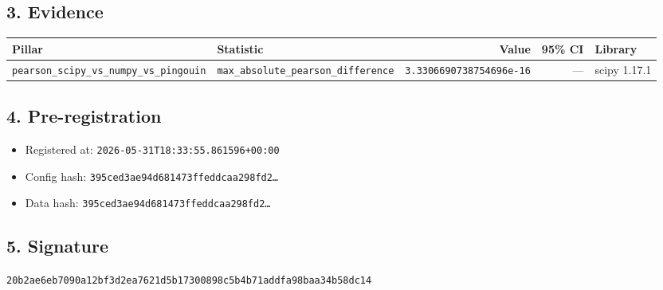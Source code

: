\documentclass{article}
\begin{document}
\subsection*{3. Evidence}
\begin{tabular}{llrrl}\toprule
\textbf{Pillar} & \textbf{Statistic} & \textbf{Value} & \textbf{95\% CI} & \textbf{Library} \\\midrule
\texttt{pearson\_scipy\_vs\_numpy\_vs\_pingouin} & \texttt{max\_absolute\_pearson\_difference} & \texttt{3.3306690738754696e-16} & --- & scipy 1.17.1 \\
\bottomrule\end{tabular}
\subsection*{4. Pre-registration}
\begin{itemize}
\item Registered at: \texttt{2026-05-31T18:33:55.861596+00:00}
\item Config hash: \texttt{395ced3ae94d681473ffeddcaa298fd2\dots}
\item Data hash: \texttt{395ced3ae94d681473ffeddcaa298fd2\dots}
\end{itemize}
\subsection*{5. Signature}
\texttt{20b2ae6eb7090a12bf3d2ea7621d5b17300898c5b4b71addfa98baa34b58dc14}\\
\end{document}
